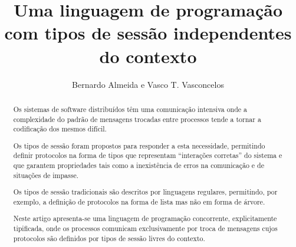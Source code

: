 \documentclass[runningheads]{llncs}
\begin{document}
\title{Uma linguagem de programação com tipos de sessão independentes do contexto}

%

%
\author{Bernardo Almeida e Vasco T. Vasconcelos}


%
\maketitle

\begin{abstract}

  Os sistemas de software distribuídos têm uma comunicação intensiva onde a complexidade do padrão de mensagens trocadas entre processos tende a tornar a codificação dos mesmos difícil.
  
  Os tipos de sessão foram propostos para responder a esta necessidade, permitindo definir protocolos na forma de tipos que representam ``interações corretas'' do sistema e que garantem propriedades tais como a inexistência de erros na comunicação e de situações de impasse.
  
  Os tipos de sessão tradicionais são descritos por linguagens regulares, permitindo, por exemplo, a definição de protocolos na forma de lista mas não em forma de árvore.

  Neste artigo apresenta-se uma linguagem de programação concorrente, explicitamente tipificada, onde os processos comunicam exclusivamente por troca de mensagens cujos protocolos são definidos por tipos de sessão livres do contexto.


\end{abstract}







\end{document}
